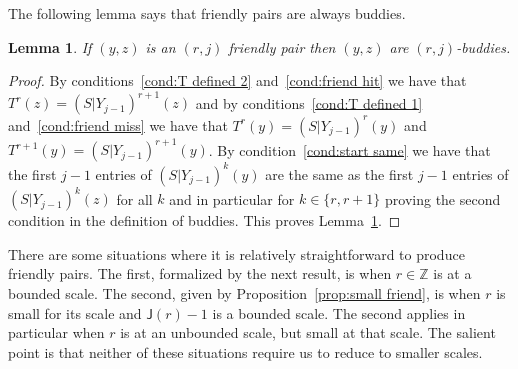 \documentclass[10pt]{amsart}
\newtheorem{lemm}[theo]{Lemma}\newtheorem{prop}[theo]{Proposition}\newtheorem{coro}[theo]{Corollary}\newtheorem{conj}[theo]{Conjecture}
\theoremstyle{definition}\newtheorem{defi}[theo]{Definition}\newtheorem{rema}[theo]{Remark}\newtheorem{exam}[theo]{Example}\newtheorem{exem}[theo]{Example}\newtheorem{nota}[theo]{Notation}
\newcommand{\Z}{\mathbb{Z}}
\newcommand{\scl}{\mathsf{J}}
\begin{document}
The following lemma says that friendly pairs are always buddies.

\begin{lemm}\label{lem:friend to weak}
If $(y,z)$ is an $(r,j)$ friendly pair then $(y,z)$ are $(r,j)$-buddies.
\end{lemm}
\begin{proof}
By conditions~\eqref{cond:T defined 2} and~\eqref{cond:friend hit} we have that $T^r(z)=(S|Y_{j-1})^{r+1}(z)$ and by conditions~\eqref{cond:T defined 1} and~\eqref{cond:friend miss} we have that $T^r(y)=(S|Y_{j-1})^r(y)$ and $T^{r+1}(y)=(S|Y_{j-1})^{r+1}(y)$. By condition~\eqref{cond:start same} we have that the first $j-1$ entries of $(S|Y_{j-1})^k(y)$ are the same as the first $j-1$ entries of $(S|Y_{j-1})^k(z)$ for all $k$ and in particular for $k \in \{r,r+1\}$ proving the second condition in the definition of buddies. This proves Lemma~\ref{lem:friend to weak}.
\end{proof}



There are some situations where it is relatively straightforward to produce friendly pairs. The first, formalized by the next result, is when $r \in \Z$ is at a bounded scale. The second, given by Proposition~\ref{prop:small friend}, is when $r$ is small for its scale and $\scl(r) - 1$ is a bounded scale. The second applies in particular when $r$ is at an unbounded scale, but small at that scale. The salient point is that neither of these situations require us to reduce to smaller scales.
\end{document}
